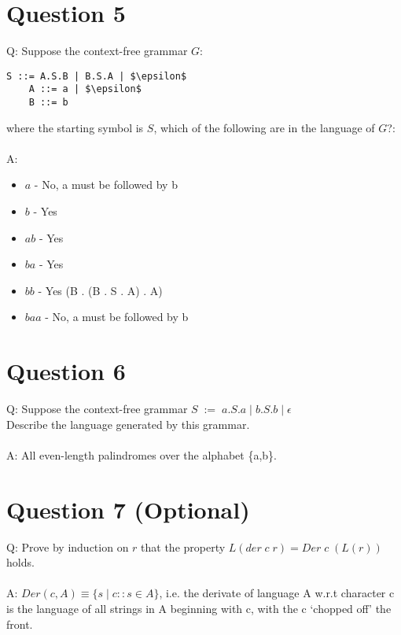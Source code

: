 \documentclass[english]{scrartcl}
\begin{document}
\section*{Question 5}
Q: Suppose the context-free grammar $G$:
\begin{Verbatim}[mathescape,commandchars=\\\{\}]
    S ::= A.S.B | B.S.A | $\epsilon$
    A ::= a | $\epsilon$
    B ::= b
\end{Verbatim}
where the starting symbol is $S$, which of the following are in the language of $G$?:\\
\\
A:
\begin{multicols}{2}
\begin{itemize}
    \item $a$ - No, a must be followed by b
    \item $b$ - Yes
    \item $ab$ - Yes
    \item $ba$ - Yes
    \item $bb$ - Yes (B . (B . S . A) . A)
    \item $baa$ - No, a must be followed by b
\end{itemize}
\end{multicols}

\section*{Question 6}
Q: Suppose the context-free grammar $S \; := \; a.S.a \;|\; b.S.b \;|\; \epsilon$ \\
Describe the language generated by this grammar. \\
\\
A: All even-length palindromes over the alphabet \{a,b\}.

\section*{Question 7 (Optional)}
Q: Prove by induction on $r$ that the property $L(der \; c \; r) = Der \; c \; (L(r))$ holds. \\
\\
A:
$Der(c, A) \equiv \{s \; | \; c::s \in A\}$, i.e. the derivate of language A w.r.t character c
is the language of all strings in A beginning with c, with the c `chopped off' the front. \\
\end{document}
